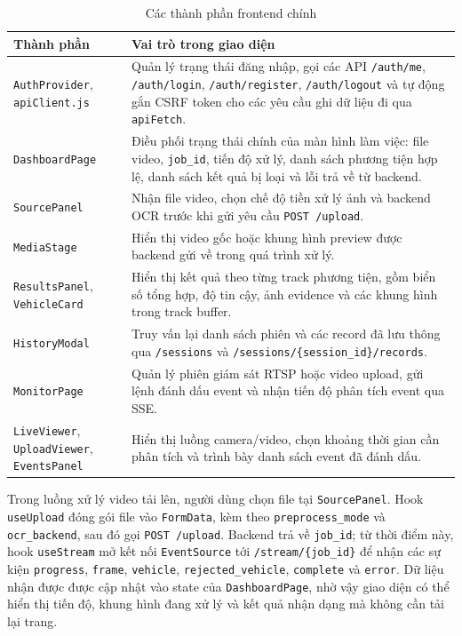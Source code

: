 \documentclass[../DoAn.tex]{subfiles}
\begin{document}
\begin{table}[H]
\centering
\renewcommand{\arraystretch}{1.15}
\begin{tabular}{|p{3.6cm}|p{9.8cm}|}
\hline
\textbf{Thành phần} & \textbf{Vai trò trong giao diện} \\ \hline
\texttt{AuthProvider}, \texttt{apiClient.js} & Quản lý trạng thái đăng nhập, gọi các API \texttt{/auth/me}, \texttt{/auth/login}, \texttt{/auth/register}, \texttt{/auth/logout} và tự động gắn CSRF token cho các yêu cầu ghi dữ liệu đi qua \texttt{apiFetch}. \\ \hline
\texttt{DashboardPage} & Điều phối trạng thái chính của màn hình làm việc: file video, \texttt{job\_id}, tiến độ xử lý, danh sách phương tiện hợp lệ, danh sách kết quả bị loại và lỗi trả về từ backend. \\ \hline
\texttt{SourcePanel} & Nhận file video, chọn chế độ tiền xử lý ảnh và backend OCR trước khi gửi yêu cầu \texttt{POST /upload}. \\ \hline
\texttt{MediaStage} & Hiển thị video gốc hoặc khung hình preview được backend gửi về trong quá trình xử lý. \\ \hline
\texttt{ResultsPanel}, \texttt{VehicleCard} & Hiển thị kết quả theo từng track phương tiện, gồm biển số tổng hợp, độ tin cậy, ảnh evidence và các khung hình trong track buffer. \\ \hline
\texttt{HistoryModal} & Truy vấn lại danh sách phiên và các record đã lưu thông qua \texttt{/sessions} và \texttt{/sessions/\{session\_id\}/records}. \\ \hline
\texttt{MonitorPage} & Quản lý phiên giám sát RTSP hoặc video upload, gửi lệnh đánh dấu event và nhận tiến độ phân tích event qua SSE. \\ \hline
\texttt{LiveViewer}, \texttt{UploadViewer}, \texttt{EventsPanel} & Hiển thị luồng camera/video, chọn khoảng thời gian cần phân tích và trình bày danh sách event đã đánh dấu. \\ \hline
\end{tabular}
\caption{Các thành phần frontend chính}
\label{table:frontend_components}
\end{table}

Trong luồng xử lý video tải lên, người dùng chọn file tại \texttt{SourcePanel}. Hook \texttt{useUpload} đóng gói file vào \texttt{FormData}, kèm theo \texttt{preprocess\_mode} và \texttt{ocr\_backend}, sau đó gọi \texttt{POST /upload}. Backend trả về \texttt{job\_id}; từ thời điểm này, hook \texttt{useStream} mở kết nối \texttt{EventSource} tới \texttt{/stream/\{job\_id\}} để nhận các sự kiện \texttt{progress}, \texttt{frame}, \texttt{vehicle}, \texttt{rejected\_vehicle}, \texttt{complete} và \texttt{error}. Dữ liệu nhận được được cập nhật vào state của \texttt{DashboardPage}, nhờ vậy giao diện có thể hiển thị tiến độ, khung hình đang xử lý và kết quả nhận dạng mà không cần tải lại trang.
\end{document}
